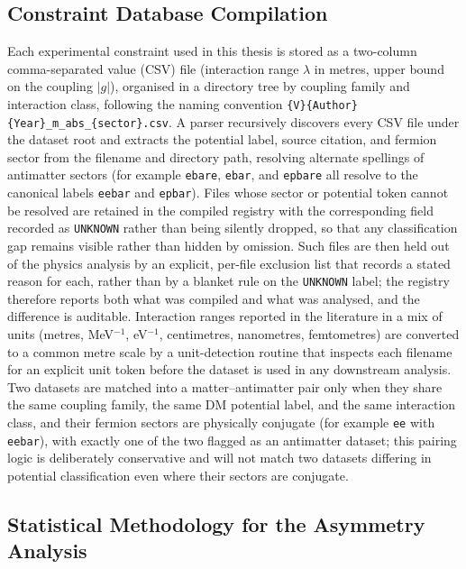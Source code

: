 \subsection{Constraint Database Compilation}
\label{sec:db-methods}

Each experimental constraint used in this thesis is stored as a
two-column comma-separated value (CSV) file (interaction range $\lambda$ in
metres, upper bound on the coupling $|g|$), organised in a directory tree
by coupling family and interaction class, following the naming convention
\texttt{\{V\}\{Author\}\{Year\}}\allowbreak\texttt{\_m\_abs\_}\allowbreak\texttt{\{sector\}.csv}. A parser
recursively discovers every CSV file under the dataset root and extracts
the potential label, source citation, and fermion sector from the filename
and directory path, resolving alternate spellings of antimatter sectors
(for example \texttt{ebare}, \texttt{ebar}, and \texttt{epbare} all resolve
to the canonical labels \texttt{eebar} and \texttt{epbar}). Files whose
sector or potential token cannot be resolved are retained in the compiled
registry with the corresponding field recorded as \texttt{UNKNOWN} rather
than being silently dropped, so that any classification gap remains visible
rather than hidden by omission. Such files are then held out of the physics
analysis by an explicit, per-file exclusion list that records a stated
reason for each, rather than by a blanket rule on the \texttt{UNKNOWN}
label; the registry therefore reports both what was compiled and what was
analysed, and the difference is auditable. Interaction ranges
reported in the literature in a mix of units (metres, MeV$^{-1}$,
eV$^{-1}$, centimetres, nanometres, femtometres) are converted to a common
metre scale by a unit-detection routine that inspects each filename for an
explicit unit token before the dataset is used in any downstream analysis.
Two datasets are matched into a matter--antimatter pair only when they
share the same coupling family, the same DM potential label, and the same
interaction class, and their fermion sectors are physically conjugate (for
example \texttt{ee} with \texttt{eebar}), with exactly one of the two
flagged as an antimatter dataset; this pairing logic is deliberately
conservative and will not match two datasets differing in potential
classification even where their sectors are conjugate.

\subsection{Statistical Methodology for the Asymmetry Analysis}
\label{sec:stat-methods}

